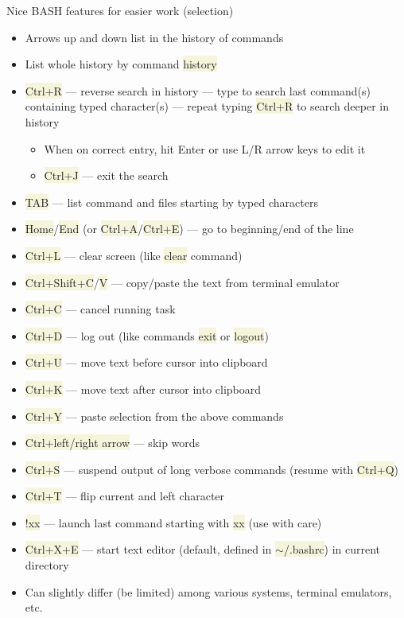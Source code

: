 \documentclass[compress, xelatex, 11pt, xcolor=svgnames, aspectratio=169,
	hyperref={
		bookmarks=true,
		unicode=true,
		colorlinks=true,
		pdftitle={Linux, command line and MetaCentrum},
		plainpages=false,
		pdfauthor={Vojtech Zeisek},
		pdfsubject={Course about use of Linux command line, writing shell scripts and using MetaCentrum of CESNET},
		pdfcreator={XeLaTeX},
		pdfkeywords={Linux, GNU, BASH, shell, command line, MetaCentrum},
		linkcolor=DarkRed, %
		anchorcolor=DarkBlue, %
		citecolor=Indigo, %
		filecolor=NavyBlue, %
		menucolor=DarkMagenta, %
		urlcolor=DarkBlue, %
		},
	url={hyphens, lowtilde} %
	]{beamer}
\renewcommand{\texttt}[1]{\colorbox{Beige}{{\ttfamily #1}}}
\begin{document}
\begin{frame}[allowframebreaks]{Nice BASH features for easier work (selection)}
	\begin{itemize}
		\item Arrows up and down list in the history of commands
		\item List whole history by command \texttt{history}
		\item \texttt{Ctrl+R} --- reverse search in history --- type to search last command(s) containing typed character(s) --- repeat typing \texttt{Ctrl+R} to search deeper in history
		\begin{itemize}
			\item When on correct entry, hit Enter or use L/R arrow keys to edit it
			\item \texttt{Ctrl+J} --- exit the search
		\end{itemize}
		\item \texttt{TAB} --- list command and files starting by typed characters
		\item \texttt{Home}/\texttt{End} (or \texttt{Ctrl+A}/\texttt{Ctrl+E}) --- go to beginning/end of the line
		\item \texttt{Ctrl+L} --- clear screen (like \texttt{clear} command)
		\item \texttt{Ctrl+Shift+C}/\texttt{V} --- copy/paste the text from terminal emulator
		\item \texttt{Ctrl+C} --- cancel running task
		\item \texttt{Ctrl+D} --- log out (like commands \texttt{exit} or \texttt{logout})
		\item \texttt{Ctrl+U} --- move text before cursor into clipboard
		\item \texttt{Ctrl+K} --- move text after cursor into clipboard
		\item \texttt{Ctrl+Y} --- paste selection from the above commands
		\item \texttt{Ctrl+left/right arrow} --- skip words
		\item \texttt{Ctrl+S} --- suspend output of long verbose commands (resume with \texttt{Ctrl+Q})
		\item \texttt{Ctrl+T} --- flip current and left character
		\item \texttt{!xx} --- launch last command starting with \texttt{xx} (use with care)
		\item \texttt{Ctrl+X+E} --- start text editor (default, defined in \texttt{$\sim$/.bashrc}) in current directory
		\item Can slightly differ (be limited) among various systems, terminal emulators, etc.
	\end{itemize}
\end{frame}
\end{document}
